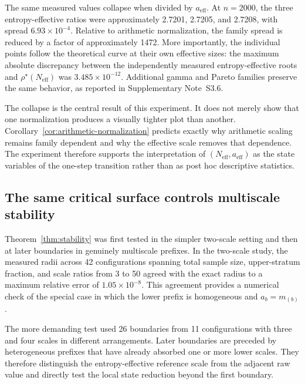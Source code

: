 \documentclass[aip,cha,reprint,superscriptaddress,floatfix]{revtex4-2}
\theoremstyle{definition}
\theoremstyle{remark}
\newcommand{\Neff}{N_{\mathrm{eff}}}
\newcommand{\aeff}{a_{\mathrm{eff}}}
\newcommand{\rhostar}{\rho^{\star}}
\begin{document}
The same measured values collapse when divided by \(\aeff\). At \(n=2000\), the three entropy-effective ratios were approximately 2.7201, 2.7205, and 2.7208, with spread \(6.93\times10^{-4}\). Relative to arithmetic normalization, the family spread is reduced by a factor of approximately 1472. More importantly, the individual points follow the theoretical curve at their own effective sizes: the maximum absolute discrepancy between the independently measured entropy-effective roots and \(\rhostar(\Neff)\) was \(3.485\times10^{-12}\). Additional gamma and Pareto families preserve the same behavior, as reported in Supplementary Note~S3.6.

The collapse is the central result of this experiment. It does not merely show that one normalization produces a visually tighter plot than another. Corollary~\ref{cor:arithmetic-normalization} predicts exactly why arithmetic scaling remains family dependent and why the effective scale removes that dependence. The experiment therefore supports the interpretation of \((\Neff,\aeff)\) as the state variables of the one-step transition rather than as post hoc descriptive statistics.

\subsection{The same critical surface controls multiscale stability}
\label{sec:result-stability}

Theorem~\ref{thm:stability} was first tested in the simpler two-scale setting and then at later boundaries in genuinely multiscale prefixes. In the two-scale study, the measured radii across 42 configurations spanning total sample size, upper-stratum fraction, and scale ratios from 3 to 50 agreed with the exact radius to a maximum relative error of \(1.05\times10^{-8}\). This agreement provides a numerical check of the special case in which the lower prefix is homogeneous and \(a_b=m_{(b)}\).

The more demanding test used 26 boundaries from 11 configurations with three and four scales in different arrangements. Later boundaries are preceded by heterogeneous prefixes that have already absorbed one or more lower scales. They therefore distinguish the entropy-effective reference scale from the adjacent raw value and directly test the local state reduction beyond the first boundary.
\end{document}

